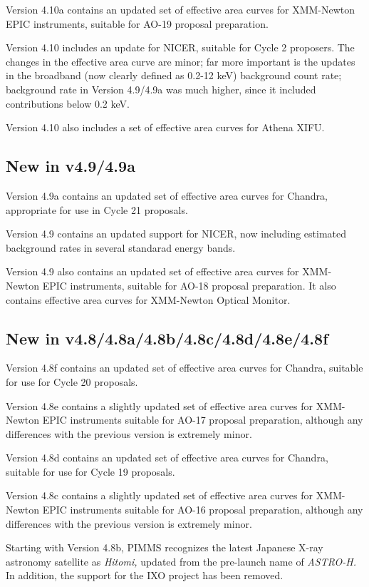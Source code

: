 \documentclass[11pt]{article}
\begin{document}
Version 4.10a contains an updated set of effective area curves for
XMM-Newton EPIC instruments, suitable for AO-19 proposal preparation.

Version 4.10 includes an update for NICER, suitable for Cycle 2 proposers.
The changes in the effective area curve are minor; far more important is
the updates in the broadband (now clearly defined as 0.2-12 keV) background
count rate; background rate in Version 4.9/4.9a was much higher, since it
included contributions below 0.2 keV.

Version 4.10 also includes a set of effective area curves for Athena XIFU.

\subsection{New in v4.9/4.9a}

Version 4.9a contains an updated set of effective area curves for Chandra,
appropriate for use in Cycle 21 proposals.

Version 4.9 contains an updated support for NICER, now including estimated
background rates in several standarad energy bands.

Version 4.9 also contains an updated set of effective area curves for
XMM-Newton EPIC instruments, suitable for AO-18 proposal preparation.
It also contains effective area curves for XMM-Newton Optical Monitor.

\subsection{New in v4.8/4.8a/4.8b/4.8c/4.8d/4.8e/4.8f}

Version 4.8f contains an updated set of effective area curves for Chandra,
suitable for use for Cycle 20 proposals.

Version 4.8e contains a slightly updated set of effective area curves
for XMM-Newton EPIC instruments suitable for AO-17 proposal preparation,
although any differences with the previous version is extremely minor.

Version 4.8d contains an updated set of effective area curves for Chandra,
suitable for use for Cycle 19 proposals.

Version 4.8c contains a slightly updated set of effective area curves
for XMM-Newton EPIC instruments suitable for AO-16 proposal preparation,
although any differences with the previous version is extremely minor.

Starting with Version 4.8b, PIMMS recognizes the latest Japanese X-ray
astronomy satellite as {\sl Hitomi,\/} updated from the pre-launch name of
{\sl ASTRO-H.\/} In addition, the support for the IXO project has been removed.
\end{document}
